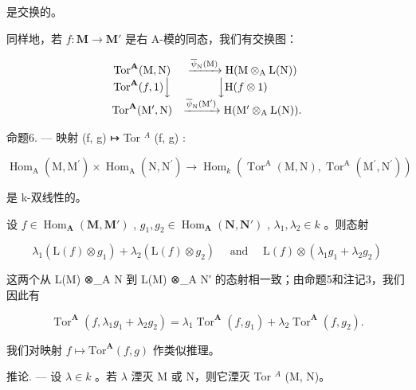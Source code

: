 是交换的。

同样地，若 \(f: \mathbf{M} \to \mathbf{M}'\) 是右 A-模的同态，我们有交换图：

\[
\begin{array}{c c} \operatorname{Tor} ^ {\mathbf {A}} (\mathrm{M}, \mathrm{N}) & \xrightarrow {\overline {{\psi}} _ {\mathrm{N}} (\mathrm{M})} \mathrm{H} (\mathrm{M} \otimes_ {\mathrm{A}} \mathrm{L} (\mathrm{N})) \\ \operatorname{Tor} ^ {\mathbf {A}} (f, 1) \Big \downarrow & \Big \downarrow \mathrm{H} (f \otimes 1) \\ \operatorname{Tor} ^ {\mathbf {A}} (\mathrm{M} ^ {\prime}, \mathrm{N}) & \xrightarrow {\overline {{\psi}} _ {\mathrm{N}} (\mathrm{M} ^ {\prime})} \mathrm{H} (\mathrm{M} ^ {\prime} \otimes_ {\mathrm{A}} \mathrm{L} (\mathrm{N})). \end{array}
\]

命题6. --- 映射 (f, g) ↦ Tor \(^{A}\) (f, g) :

\[
\operatorname{Hom} _ {\mathrm{A}} \left(\mathrm{M}, \mathrm{M} ^ {\prime}\right) \times \operatorname{Hom} _ {\mathrm{A}} \left(\mathrm{N}, \mathrm{N} ^ {\prime}\right)\rightarrow \operatorname{Hom} _ {k} \left(\operatorname{Tor} ^ {\mathrm{A}} (\mathrm{M}, \mathrm{N}), \operatorname{Tor} ^ {\mathrm{A}} \left(\mathrm{M} ^ {\prime}, \mathrm{N} ^ {\prime}\right)\right)
\]

是 k-双线性的。

设 \(f \in \operatorname{Hom}_{\mathbf{A}}(\mathbf{M}, \mathbf{M}')\) , \(g_1, g_2 \in \operatorname{Hom}_{\mathbf{A}}(\mathbf{N}, \mathbf{N}')\) , \(\lambda_1, \lambda_2 \in k\) 。则态射

\[
\lambda_ {1} (\mathrm{L} (f) \otimes g _ {1}) + \lambda_ {2} (\mathrm{L} (f) \otimes g _ {2}) \quad \text { and } \quad \mathrm{L} (f) \otimes (\lambda_ {1} g _ {1} + \lambda_ {2} g _ {2})
\]

这两个从 L(M) ⊗\_A N 到 L(M) ⊗\_A N′ 的态射相一致；由命题5和注记3，我们因此有

\[
\operatorname{Tor} ^ {\mathbf {A}} \left(f, \lambda_ {1} g _ {1} + \lambda_ {2} g _ {2}\right) = \lambda_ {1} \operatorname{Tor} ^ {\mathbf {A}} \left(f, g _ {1}\right) + \lambda_ {2} \operatorname{Tor} ^ {\mathbf {A}} \left(f, g _ {2}\right).\tag{10}
\]

我们对映射 \(f\mapsto\mathrm{Tor}^{\mathbf{A}}(f,g)\) 作类似推理。

推论. --- 设 \(\lambda\in k\) 。若 \(\lambda\) 湮灭 M 或 N，则它湮灭 Tor \(^{A}\) (M, N)。

